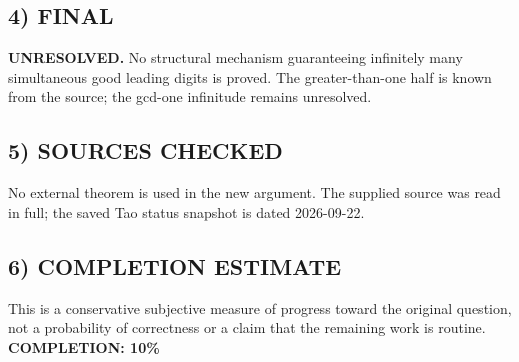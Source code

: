 \subsection{4) FINAL}
\textbf{UNRESOLVED.}
No structural mechanism guaranteeing infinitely many simultaneous good leading digits is proved. The greater-than-one half is known from the source; the gcd-one infinitude remains unresolved.
\subsection{5) SOURCES CHECKED}
No external theorem is used in the new argument. The supplied source was read in full; the saved Tao status snapshot is dated 2026-09-22.
\subsection{6) COMPLETION ESTIMATE}
This is a conservative subjective measure of progress toward the original question, not a probability of correctness or a claim that the remaining work is routine.
\textbf{COMPLETION: 10\%}
